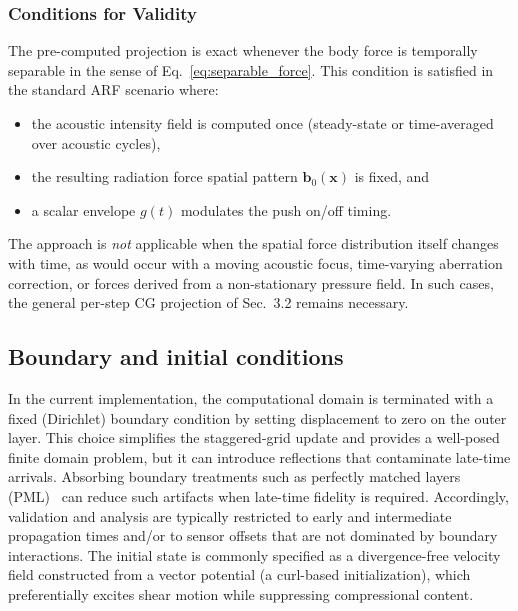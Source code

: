 \documentclass[11pt]{article}
\begin{document}
\subsubsection{Conditions for Validity}

The pre-computed projection is exact whenever the body force is temporally
separable in the sense of Eq.~\eqref{eq:separable_force}. This condition is
satisfied in the standard ARF scenario where:
\begin{itemize}[leftmargin=1.5em]
\item the acoustic intensity field is computed once (steady-state or
      time-averaged over acoustic cycles),
\item the resulting radiation force spatial pattern $\bm{b}_0(\bm{x})$ is
      fixed, and
\item a scalar envelope $g(t)$ modulates the push on/off timing.
\end{itemize}
The approach is \emph{not} applicable when the spatial force distribution
itself changes with time, as would occur with a moving acoustic focus,
time-varying aberration correction, or forces derived from a non-stationary
pressure field.  In such cases, the general per-step CG projection of
Sec.~3.2 remains necessary.


\subsection{Boundary and initial conditions}
\label{sec:bc_ic}
In the current implementation, the computational domain is terminated with a fixed
(Dirichlet) boundary condition by setting displacement to zero on the outer layer.
This choice simplifies the staggered-grid update and provides a well-posed finite
domain problem, but it can introduce reflections that contaminate late-time arrivals.
Absorbing boundary treatments such as perfectly matched layers (PML)~\cite{berenger1994perfect,collino2001application} can reduce such artifacts when late-time fidelity is required. Accordingly, validation and analysis are typically restricted to early and
intermediate propagation times and/or to sensor offsets that are not dominated by
boundary interactions. The initial state is commonly specified as a divergence-free
velocity field constructed from a vector potential (a curl-based initialization),
which preferentially excites shear motion while suppressing compressional content.
\end{document}
